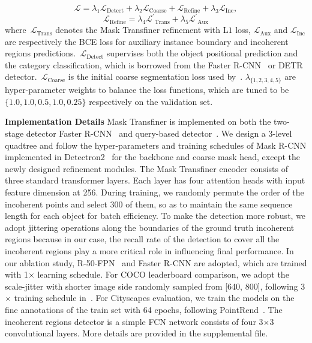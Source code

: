 \documentclass[10pt,twocolumn,letterpaper]{article}
\newcommand{\parsection}[1]{\vspace{1mm}\noindent\textbf{#1}}
\begin{document}
\begin{equation}
\mathcal{L} = \lambda_1\mathcal{L}_{\text{Detect}} +  \lambda_2\mathcal{L}_{\text{Coarse}} + \mathcal{L}_{\text{Refine}} + \lambda_3\mathcal{L}_{\text{Inc}},
\end{equation}
\vspace{-0.2in}
\begin{equation}
\mathcal{L}_{\text{Refine}} = \lambda_4\mathcal{L^\prime}_{\text{Trans}} + \lambda_5\mathcal{L^\prime}_{\text{Aux}}
\end{equation}
where~$\mathcal{L}_{\text{Trans}}$ denotes the Mask Transfiner refinement with L$1$ loss, $\mathcal{L}_{\text{Aux}}$ and $\mathcal{L}_{\text{Inc}}$ are respectively the BCE loss for auxiliary instance boundary and incoherent regions predictions.~$\mathcal{L}_{\text{Detect}}$ supervises both the object positional prediction and the category classification, which is  borrowed from the Faster R-CNN~\cite{tian2019fcos} or DETR detector.~$\mathcal{L}_{\text{Coarse}}$ is the initial coarse segmentation loss used by~\cite{he2017mask}. $\lambda_{\{1,2,3,4,5\}}$ are hyper-parameter weights to balance the loss functions, which are tuned to be $\{1.0, 1.0, 0.5, 1.0, 0.25\}$ respectively on the validation set. 

\parsection{Implementation Details}
Mask Transfiner is implemented on both the two-stage detector Faster R-CNN~\cite{ren2015faster} and query-based detector~\cite{carion2020end}. 
We design a 3-level quadtree and follow the hyper-parameters and training schedules of Mask R-CNN implemented in Detectron2~\cite{wu2019detectron2} for the backbone and coarse mask head, except the newly designed refinement modules.
The Mask Transfiner encoder consists of three standard transformer layers. Each layer has four attention heads with input feature dimension at 256.
During training, we randomly permute the order of the incoherent points and select 300 of them, so as to maintain the  same sequence length for each object for batch efficiency. 
To make the detection more robust, we adopt jittering operations along the boundaries of the ground truth incoherent regions because in our case, the recall rate of the detection to cover all the incoherent regions play a more critical role in influencing final performance.
In our ablation study, R-50-FPN~\cite{he2016deep} and Faster R-CNN are adopted, which are trained with 1$\times$ learning schedule.
For COCO leaderboard comparison, we adopt the scale-jitter with shorter image side randomly sampled from [640, 800], following 3$\times$ training schedule in~\cite{lee2019centermask,chen2019tensormask,ke2021bcnet}.
For Cityscapes evaluation, we train the models on the fine annotations of the train set with 64 epochs, following PointRend~\cite{kirillov2020pointrend}.
The incoherent regions detector is a simple FCN network consists of four 3$\times$3 convolutional layers.
More details are provided in the supplemental file.
\end{document}

